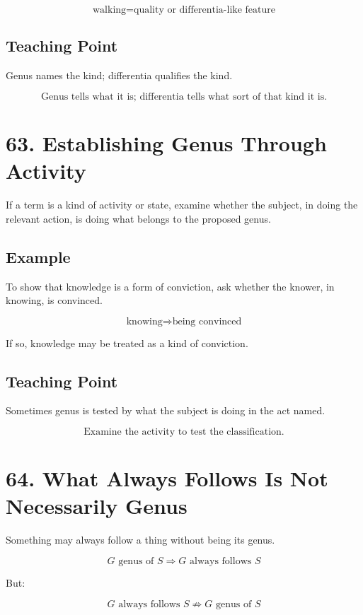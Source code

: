 \documentclass[12pt]{article}
\begin{document}
\[
\text{walking} = \text{quality or differentia-like feature}
\]

\subsection*{Teaching Point}

Genus names the kind; differentia qualifies the kind.

\[
\boxed{
\text{Genus tells what it is; differentia tells what sort of that kind it is.}
}
\]

\section*{63. Establishing Genus Through Activity}

If a term is a kind of activity or state, examine whether the subject, in doing
the relevant action, is doing what belongs to the proposed genus.

\subsection*{Example}

To show that knowledge is a form of conviction, ask whether the knower, in
knowing, is convinced.

\[
\text{knowing} \Rightarrow \text{being convinced}
\]

If so, knowledge may be treated as a kind of conviction.

\subsection*{Teaching Point}

Sometimes genus is tested by what the subject is doing in the act named.

\[
\boxed{
\text{Examine the activity to test the classification.}
}
\]

\section*{64. What Always Follows Is Not Necessarily Genus}

Something may always follow a thing without being its genus.

\[
G \text{ genus of } S
\Rightarrow
G \text{ always follows } S
\]

But:

\[
G \text{ always follows } S
\not\Rightarrow
G \text{ genus of } S
\]
\end{document}
